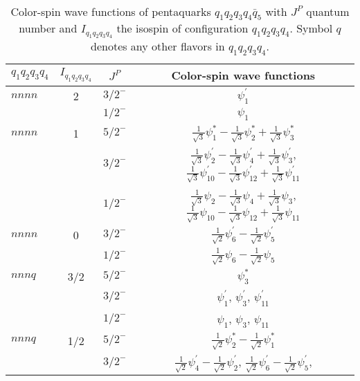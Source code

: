 \documentclass[prd,twocolumn,floatfix,nofootinbib]{revtex4}
\begin{document}
\renewcommand{\tabcolsep}{0.6cm} \renewcommand{\arraystretch}{1.5}
\begin{table*}[!htb]
    \caption{Color-spin wave functions of pentaquarks $q_{1}q_{2}q_{3}q_{4}\bar{q}_{5}$ 
        with $J^{P}$ quantum number and $I_{q_{1}q_{2}q_{3}q_{4}}$ the isospin
        of configuration $q_{1}q_{2}q_{3}q_{4}$. Symbol $q$ denotes any other flavors in $q_{1}q_{2}q_{3}q_{4}$.}
    \label{tab:basis}
    \begin{tabular}{lccc}
    \bottomrule[1.5pt]\bottomrule[0.5pt]
        $q_{1}q_{2}q_{3}q_{4}$ &$I_{q_{1}q_{2}q_{3}q_{4}}$ &$J^{P}$ &Color-spin wave functions \\ \hline
        $nnnn$ & 2
            & ${3/2}^{-}$ & $\psi_{1}^{\prime}$ \\
        &   & ${1/2}^{-}$ & $\psi_{1}$ \\
        $nnnn$ & 1
            & ${5/2}^{-}$ & $\frac{1}{\sqrt{3}}\psi_{1}^{\ast}-\frac{1}{\sqrt{3}}\psi_{2}^{\ast}+\frac{1}{\sqrt{3}}\psi_{3}^{\ast}$ \\
        &   & ${3/2}^{-}$ & $\frac{1}{\sqrt{3}}\psi_{2}^{\prime}-\frac{1}{\sqrt{3}}\psi_{4}^{\prime}+\frac{1}{\sqrt{3}}\psi_{3}^{\prime}$,
                $\frac{1}{\sqrt{3}}\psi_{10}^{\prime}-\frac{1}{\sqrt{3}}\psi_{12}^{\prime}+\frac{1}{\sqrt{3}}\psi_{11}^{\prime}$ \\
        &   & ${1/2}^{-}$ & $\frac{1}{\sqrt{3}}\psi_{2}-\frac{1}{\sqrt{3}}\psi_{4}+\frac{1}{\sqrt{3}}\psi_{3}$,
                $\frac{1}{\sqrt{3}}\psi_{10}-\frac{1}{\sqrt{3}}\psi_{12}+\frac{1}{\sqrt{3}}\psi_{11}$ \\
        $nnnn$ & 0
            & ${3/2}^{-}$ & $\frac{1}{\sqrt{2}}\psi_{6}^{\prime}-\frac{1}{\sqrt{2}}\psi_{5}^{\prime}$ \\
        &   & ${1/2}^{-}$ & $\frac{1}{\sqrt{2}}\psi_{6}-\frac{1}{\sqrt{2}}\psi_{5}$ \\
        $nnnq$ & 3/2
            & ${5/2}^{-}$ & $\psi_{3}^{\ast}$ \\
        &   & ${3/2}^{-}$ & $\psi_{1}^{\prime}$, $\psi_{3}^{\prime}$, $\psi_{11}^{\prime}$ \\
        &   & ${1/2}^{-}$ & $\psi_{1}$, $\psi_{3}$, $\psi_{11}$ \\
        $nnnq$ & 1/2
            & ${5/2}^{-}$ & $\frac{1}{\sqrt{2}}\psi_{2}^{\ast}-\frac{1}{\sqrt{2}}\psi_{1}^{\ast}$ \\
        &   & ${3/2}^{-}$ & $\frac{1}{\sqrt{2}}\psi_{4}^{\prime}-\frac{1}{\sqrt{2}}\psi_{2}^{\prime}$,
                $\frac{1}{\sqrt{2}}\psi_{6}^{\prime}-\frac{1}{\sqrt{2}}\psi_{5}^{\prime}$,

\end{tabular}
\end{table*}
\end{document}
